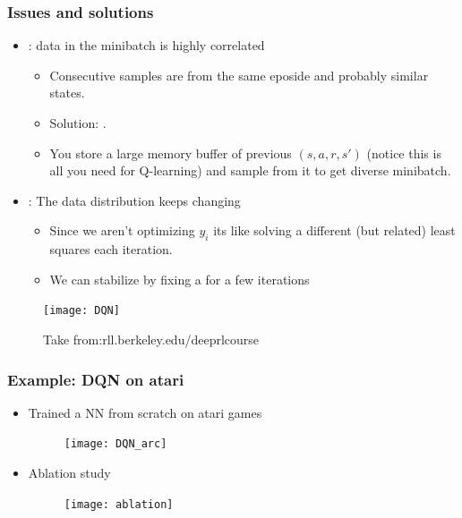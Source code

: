 \documentclass[handout]{beamer}
\begin{document}
\begin{frame}\frametitle{Issues and solutions}\small

\begin{itemize}
	\item {}: data in the minibatch is highly correlated
	\begin{itemize}
		\item Consecutive samples are from the same eposide and probably similar states.
		\item Solution: .
		\item You store a large memory buffer of previous $(s,a,r,s')$ (notice this is all you need for Q-learning) and sample from it to get diverse minibatch.
	\end{itemize}
	\item {}: The data distribution keeps changing
\begin{itemize}
	\item Since we aren't optimizing $y_i$ its like solving a different (but related) least squares each iteration.
	\item We can stabilize by fixing a  for a few iterations 
\end{itemize}

\end{itemize}

	\begin{figure}
	\texttt{[image: DQN]}
	\vspace{-0.4cm}
	\caption{Take from:rll.berkeley.edu/deeprlcourse}
\end{figure}
\end{frame}

\begin{frame}\frametitle{Example: DQN on atari}\small

\begin{itemize}
	\item Trained a NN from scratch on atari games 

\begin{figure}
	\texttt{[image: DQN\_arc]}
\end{figure}
\item Ablation study
\begin{figure}
	\texttt{[image: ablation]}
\end{figure}
\end{itemize}

\end{frame}
\end{document}
